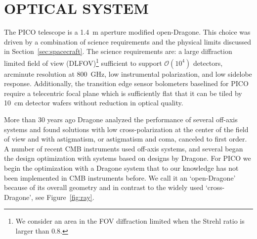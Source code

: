 \documentclass[]{spie}  %
\newcommand{\comr}[1]{\textcolor{red}{#1}}
\newcommand{\como}[1]{\textcolor{orange}{#1}}
\begin{document}
\section{OPTICAL SYSTEM}
\label{sec:optics}

The PICO telescope is a 1.4~m aperture modified open-Dragone.  This choice was driven by a combination of science
requirements and the physical limits discussed in Section~\ref{sec:spacecraft}.  The science requirements are: a large diffraction 
limited field of view (DLFOV)\footnote{ We consider an area in the FOV diffraction limited when the Strehl ratio is 
larger than 0.8.} sufficient to support $\mathcal{O}(10^4)$ detectors, arcminute resolution at 800~GHz, low 
instrumental polarization, and low sidelobe response. Additionally, 
the transition edge sensor bolometers baselined for PICO require a telecentric focal plane which is sufficiently flat that it 
can be tiled by 10~cm detector wafers without reduction in optical quality. 

More than 30 years ago Dragone analyzed the 
performance of several off-axis systems and found solutions with low cross-polarization at the center of the field 
of view and with astigmatism, or astigmatism and coma, canceled to first order.\cite{dragone,dragone_coma,dragone1983} 
A number of recent CMB instruments used off-axis systems, and several 
began the design optimization with systems based on designs by
Dragone\cite{planck2000_optics,ACT2011_optics,SPT2008_optics,core2018_inst,LB2016_optics,parshley_ccat_spie}. 
For PICO we begin 
the optimization with a Dragone system that to our knowledge has not been implemented in CMB instruments before. 
We call it an `open-Dragone' because of its overall geometry and in contrast to the widely used `cross-Dragone', see Figure~\ref{fig:ray}. 

\end{document}
